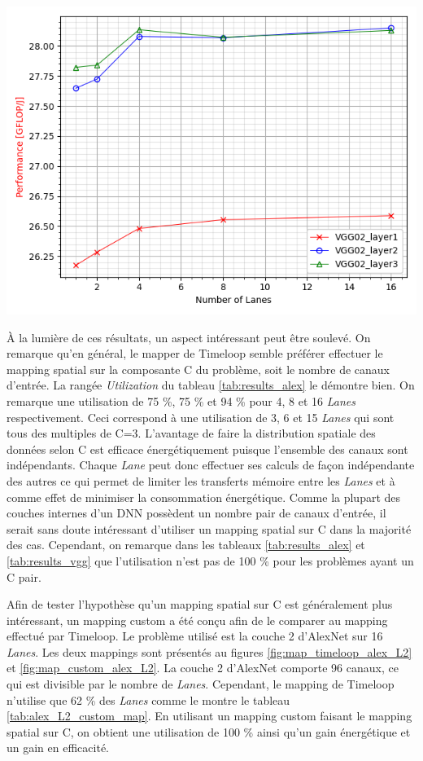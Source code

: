 \documentclass[11pt,letterpaper]{article}
\begin{document}
\begin{multicols}{2}
    {\centering
    \includegraphics[width=\linewidth]{VGG_performance.png}
    \captionsetup{hypcap=false}
    \label{fig:perf_vgg}}
    \bigskip

    À la lumière de ces résultats, un aspect intéressant peut être soulevé. On remarque qu'en général, le mapper de 
    Timeloop semble préférer effectuer le mapping spatial sur la composante C du problème, soit le nombre de canaux d'entrée.
    La rangée \textit{Utilization} du tableau \ref{tab:results_alex} le démontre bien. On remarque une utilisation de 
    75 \%, 75 \% et 94 \% pour 4, 8 et 16 \textit{Lanes} respectivement. Ceci correspond à une utilisation de 3, 6 et 15 \textit{Lanes}
    qui sont tous des multiples de C=3. L'avantage de faire la distribution spatiale des données selon C est efficace énergétiquement
    puisque l'ensemble des canaux sont indépendants. Chaque \textit{Lane} peut donc effectuer ses calculs de façon indépendante des autres
    ce qui permet de limiter les transferts mémoire entre les \textit{Lanes} et à comme effet de minimiser la consommation énergétique.
    Comme la plupart des couches internes d'un DNN possèdent un nombre pair de canaux d'entrée, il serait sans doute intéressant d'utiliser
    un mapping spatial sur C dans la majorité des cas. Cependant, on remarque dans les tableaux \ref{tab:results_alex} et \ref{tab:results_vgg} 
    que l'utilisation n'est pas de 100 \% pour les problèmes ayant un C pair.  

    Afin de tester l'hypothèse qu'un mapping spatial sur C est généralement plus intéressant, un mapping custom a été 
    conçu afin de le comparer au mapping effectué par Timeloop. Le problème utilisé est la couche 2 d'AlexNet sur 16 \textit{Lanes}.
    Les deux mappings sont présentés au figures \ref{fig:map_timeloop_alex_L2} et \ref{fig:map_custom_alex_L2}.
    La couche 2 d'AlexNet comporte 96 canaux, ce qui est divisible par le nombre de \textit{Lanes}. Cependant, le mapping 
    de Timeloop n'utilise que 62 \% des \textit{Lanes} comme le montre le tableau \ref{tab:alex_L2_custom_map}. En utilisant 
    un mapping custom faisant le mapping spatial sur C, on obtient une utilisation de 100 \% ainsi qu'un gain énergétique
    et un gain en efficacité. 


\end{multicols}
\end{document}
